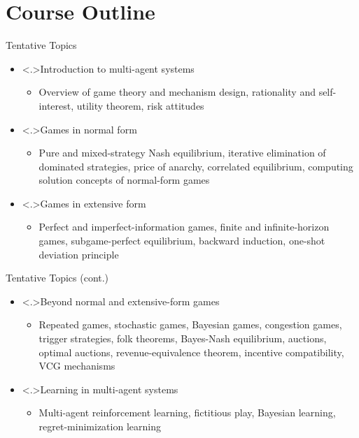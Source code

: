 \documentclass[11pt,aspectratio=169,handout]{beamer}
\begin{document}
 \section{Course Outline}
  \begin{frame}{Tentative Topics}
   \begin{itemize}[<+->]
    \setlength{\itemsep}{1em}
    \item\alert<.>{Introduction to multi-agent systems}
    \begin{itemize}[<.->]
     \item Overview of game theory and mechanism design, rationality and self-interest, utility theorem, risk attitudes
    \end{itemize}
    \item\alert<.>{Games in normal form}
    \begin{itemize}[<.->]
     \item Pure and mixed-strategy Nash equilibrium, iterative elimination of dominated strategies, price of anarchy, correlated equilibrium, computing solution concepts of normal-form games
    \end{itemize}
    \item\alert<.>{Games in extensive form}
    \begin{itemize}[<.->]
     \item Perfect and imperfect-information games, finite and infinite-horizon games, subgame-perfect equilibrium, backward induction, one-shot deviation principle
    \end{itemize}
   \end{itemize}
  \end{frame}
 
  \begin{frame}{Tentative Topics (cont.)}
   \begin{itemize}[<+->]
    \setlength{\itemsep}{1em}
    \item\alert<.>{Beyond normal and extensive-form games}
    \begin{itemize}[<.->]
     \item Repeated games, stochastic games, Bayesian games, congestion games, trigger strategies, folk theorems, Bayes-Nash equilibrium, auctions, optimal auctions, revenue-equivalence theorem, incentive compatibility, VCG mechanisms
    \end{itemize}
    \item\alert<.>{Learning in multi-agent systems}
    \begin{itemize}[<.->]
     \item Multi-agent reinforcement learning, fictitious play, Bayesian learning, regret-minimization learning
    \end{itemize}
   \end{itemize}
  \end{frame}
 
\end{document}
